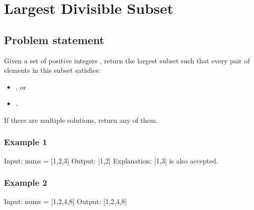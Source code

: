 \documentclass[letterpaper,12pt,english]{book}
\begin{document}
\sphinxstepscope


\section{Largest Divisible Subset}
\label{\detokenize{Dynamic_Programming/05_DP_368_Largest_Divisible_Subset:largest-divisible-subset}}\label{\detokenize{Dynamic_Programming/05_DP_368_Largest_Divisible_Subset::doc}}

\subsection{Problem statement\sphinxfootnotemark[96]}
\label{\detokenize{Dynamic_Programming/05_DP_368_Largest_Divisible_Subset:problem-statement}}%
\begin{footnotetext}[96]\sphinxAtStartFootnote
{}
%
\end{footnotetext}\ignorespaces 
\sphinxAtStartPar
Given a set of  positive integers , return the largest subset  such that every pair  of elements in this subset satisfies:
\begin{itemize}
\item {} 
\sphinxAtStartPar
{}, or

\item {} 
\sphinxAtStartPar
{}.

\end{itemize}

\sphinxAtStartPar
If there are multiple solutions, return any of them.


\subsubsection{Example 1}
\label{\detokenize{Dynamic_Programming/05_DP_368_Largest_Divisible_Subset:example-1}}
\begin{sphinxVerbatim}[commandchars=\\\{\}]
Input: nums = [1,2,3]
Output: [1,2]
Explanation: [1,3] is also accepted.
\end{sphinxVerbatim}


\subsubsection{Example 2}
\label{\detokenize{Dynamic_Programming/05_DP_368_Largest_Divisible_Subset:example-2}}
\begin{sphinxVerbatim}[commandchars=\\\{\}]
Input: nums = [1,2,4,8]
Output: [1,2,4,8]
\end{sphinxVerbatim}
\end{document}
